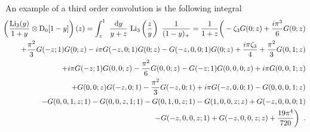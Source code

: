\documentclass[12pt]{article}
\def\beeq{\begin{eqnarray}}
\def\eeeq{\end{eqnarray}}
\def\nn{\nonumber}
\newcommand\f[2]{\frac{#1}{#2}}
\DeclareRobustCommand{\rd}{\ensuremath{\mathrm{d}}}
\begin{document}
\begin{appendix}
An example of a third order convolution is the following integral
\beeq\label{Convoexamp}
   &&\!\!\!\!\!\!\!\!\left(\f{{\rm Li}_{3}( y) }{1+y}\otimes  {\rm D}_{0}[1-y]\right)(z) = \int^{1}_{z}~\f{\rd y}{y+z}~{\rm Li}_{3}\left(\f{z}{y}\right)~\f{1}{(1-y)_{+}}  =\f{1}{1+z}\bigg(-  \zeta_{3} G(0;z)+\frac{i \pi ^3 }{6 }G(0;z)\nn\\
   &&\!\!\!\!\!\!\!\!\!\!+\f{\pi ^2}{3}G(-z;1) G(0;z)-i \pi  G(-z,0;1)G(0;z)-G(-z,0,0;1) G(0;z)+\frac{i\pi  \zeta_{3}}{4}+\frac{\pi ^2 }{3 }G(0,1;z)\nn\\
   &&\!\!\!\!\!\!\!\!\!\! +i \pi  G(-z;1) G(0,0;z)-\frac{\pi ^2 }{6 }G(0,0;z)-G(-z;1) G(0,0,0;z)+i \pi G(0,0,1;z)\nn\\
   &&\!\!\!\!\!\!\!\!\!\! +G(0,0;z)G(-z,0;1)-\frac{\pi ^2 }{3}G(-z,0;1)+i \pi G(-z,0,0;1)-G(0,0,0,1;z)\nn\\
   &&\!\!\!\!\!\!\!\!\!\!-G(0,0,1,z;1)-G(0,0,z,1;1)-G(0,1,0,z;1)-G(1,0,0,z;z)+G(-z,0,0,0;1)\nn\\
   &&\!\!\!\!\!\!\!\!\!\!-G(-z,0,0,z;1)+G(-z,0,0,z;z) +\frac{19 \pi ^4}{720 }\bigg)\;\;.
\eeeq

\end{appendix}
\end{document}
